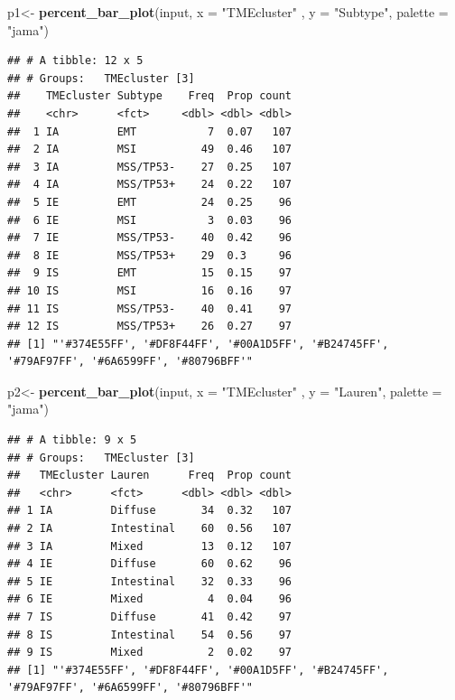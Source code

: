 \documentclass[
  12pt,
]{book}
\newenvironment{Shaded}{\begin{snugshade}}{\end{snugshade}}
\newcommand{\AttributeTok}[1]{\textcolor[rgb]{0.13,0.29,0.53}{#1}}
\newcommand{\FunctionTok}[1]{\textcolor[rgb]{0.13,0.29,0.53}{\textbf{#1}}}
\newcommand{\NormalTok}[1]{#1}
\newcommand{\OtherTok}[1]{\textcolor[rgb]{0.56,0.35,0.01}{#1}}
\newcommand{\StringTok}[1]{\textcolor[rgb]{0.31,0.60,0.02}{#1}}
\begin{document}
\begin{Shaded}
\begin{Highlighting}[]
\NormalTok{p1}\OtherTok{\textless{}{-}} \FunctionTok{percent\_bar\_plot}\NormalTok{(input, }\AttributeTok{x =} \StringTok{"TMEcluster"}\NormalTok{ , }\AttributeTok{y =} \StringTok{"Subtype"}\NormalTok{, }\AttributeTok{palette =} \StringTok{"jama"}\NormalTok{)}
\end{Highlighting}
\end{Shaded}

\begin{verbatim}
## # A tibble: 12 x 5
## # Groups:   TMEcluster [3]
##    TMEcluster Subtype    Freq  Prop count
##    <chr>      <fct>     <dbl> <dbl> <dbl>
##  1 IA         EMT           7  0.07   107
##  2 IA         MSI          49  0.46   107
##  3 IA         MSS/TP53-    27  0.25   107
##  4 IA         MSS/TP53+    24  0.22   107
##  5 IE         EMT          24  0.25    96
##  6 IE         MSI           3  0.03    96
##  7 IE         MSS/TP53-    40  0.42    96
##  8 IE         MSS/TP53+    29  0.3     96
##  9 IS         EMT          15  0.15    97
## 10 IS         MSI          16  0.16    97
## 11 IS         MSS/TP53-    40  0.41    97
## 12 IS         MSS/TP53+    26  0.27    97
## [1] "'#374E55FF', '#DF8F44FF', '#00A1D5FF', '#B24745FF', '#79AF97FF', '#6A6599FF', '#80796BFF'"
\end{verbatim}

\begin{Shaded}
\begin{Highlighting}[]
\NormalTok{p2}\OtherTok{\textless{}{-}} \FunctionTok{percent\_bar\_plot}\NormalTok{(input, }\AttributeTok{x =} \StringTok{"TMEcluster"}\NormalTok{ , }\AttributeTok{y =} \StringTok{"Lauren"}\NormalTok{, }\AttributeTok{palette =} \StringTok{"jama"}\NormalTok{)}
\end{Highlighting}
\end{Shaded}

\begin{verbatim}
## # A tibble: 9 x 5
## # Groups:   TMEcluster [3]
##   TMEcluster Lauren      Freq  Prop count
##   <chr>      <fct>      <dbl> <dbl> <dbl>
## 1 IA         Diffuse       34  0.32   107
## 2 IA         Intestinal    60  0.56   107
## 3 IA         Mixed         13  0.12   107
## 4 IE         Diffuse       60  0.62    96
## 5 IE         Intestinal    32  0.33    96
## 6 IE         Mixed          4  0.04    96
## 7 IS         Diffuse       41  0.42    97
## 8 IS         Intestinal    54  0.56    97
## 9 IS         Mixed          2  0.02    97
## [1] "'#374E55FF', '#DF8F44FF', '#00A1D5FF', '#B24745FF', '#79AF97FF', '#6A6599FF', '#80796BFF'"
\end{verbatim}
\end{document}
